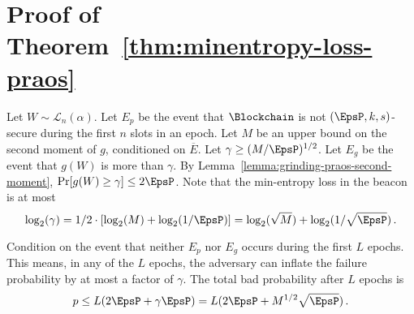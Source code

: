 

%
%
%







\section{Proof of Theorem~\ref{thm:minentropy-loss-praos}}\label{sec:proof-praos-theorem}

Let $W \sim \mathcal{L}_n(\alpha)$. 
Let $E_p$ be the event that 
$\Blockchain$ is not $(\EpsP, k, s)$-secure during 
the first $n$ slots in an epoch. 
Let $M$ be an upper bound on the second moment of $g$, 
conditioned on $\overline{E}$. 
Let $\gamma \geq (M/\EpsP)^{1/2}$. 
Let $E_g$ be the event that $g(W)$ is more than $\gamma$.
By Lemma~\ref{lemma:grinding-praos-second-moment}, 
$\Pr[g(W) \geq \gamma] \leq 2 \EpsP$. 
Note that the min-entropy loss in the beacon is at most 
\begin{equation}\label{eq:log-gamma}
 \log_2(\gamma) 
 = 1/2 \cdot [\log_2(M) + \log_2(1/\EpsP)]
 = \log_2(\sqrt{M}) + \log_2(1/\sqrt{\EpsP})
 \,. 
\end{equation}


Condition on the event that neither $E_p$ nor $E_g$ 
occurs during the first $L$ epochs. 
This means, in any of the $L$ epochs, 
the adversary can inflate the failure probability 
by at most a factor of $\gamma$.
The total bad probability after $L$ epochs is
$$
  p
  \leq L (2 \EpsP + \gamma \EpsP)
  = L (2 \EpsP + M^{1/2} \sqrt{\EpsP})
  \,.
$$


